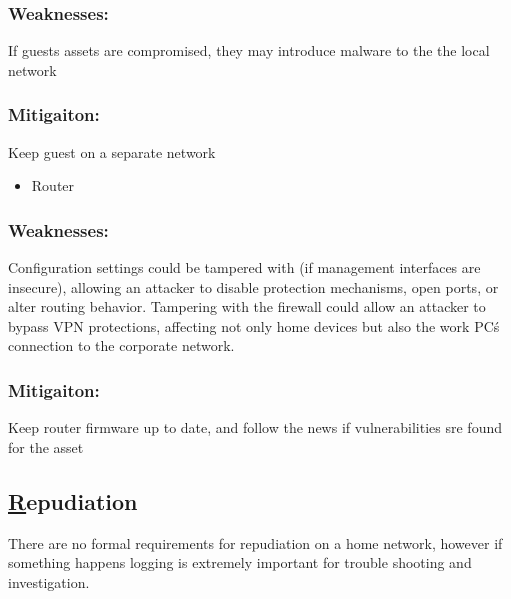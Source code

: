 \documentclass[
	letterpaper, %
	10pt, %
	unnumberedsections, %
	twoside, %
]{APAAssignment}
\begin{document}
\begin{singlespace}
	\subsubsection{Weaknesses:} If guests assets are compromised, they may introduce malware to the the local network  
	\subsubsection{Mitigaiton:} Keep guest on a separate network
	
	\begin{itemize}
		\item Router
	\end{itemize}
	
	\subsubsection{Weaknesses:} Configuration settings could be tampered with (if management interfaces are insecure), allowing an attacker to disable protection mechanisms, open ports, or alter routing behavior. Tampering with the firewall could allow an attacker to bypass VPN protections, affecting not only home devices but also the work PC\'s connection to the corporate network.
	\subsubsection{Mitigaiton:} Keep router firmware up to date, and follow the news if vulnerabilities sre found for the asset
	
	
\end{singlespace}
	

\subsection{\underline{R}epudiation}
There are no formal requirements for repudiation on a home network, however if something happens logging is extremely important for trouble shooting and investigation.  
\end{document}
